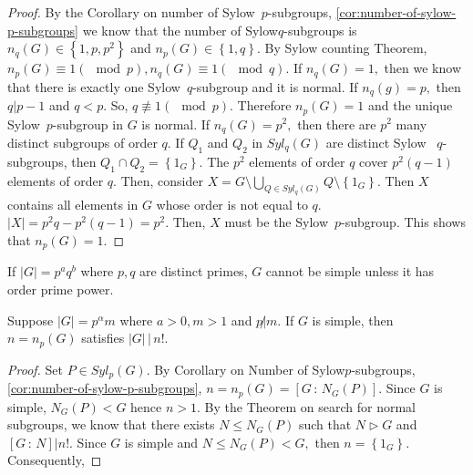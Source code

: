 \begin{theorem}
\end{theorem}

\begin{proof}
	By the Corollary on number of Sylow~$p$\nobreakdash-subgroups, 
	\cref{cor:number-of-sylow-p-subgroups} we know that the number of
	Sylow$q$\nobreakdash-subgroups is $n_q(G) \in \left\{ 1, p, p^2 \right\} $ and
	$n_p(G) \in \left\{ 1, q \right\} .$ By Sylow counting Theorem,
	$n_p(G) \equiv 1 (\mod p ), n_q(G) \equiv 1 (\mod q ).$ If $n_q(G) = 1,$
	then we know that there is exactly one Sylow~$q$\nobreakdash-subgroup
	and it is normal.
	If $n_q(g) = p,$ then $q | p-1$ and $ q < p.$ So, $q \not \equiv 1 
	(\mod p).$ Therefore $n_p(G) = 1$ and the unique Sylow~$p$\nobreakdash-subgroup
	in $G$ is normal. If $n_q(G) = p^2,$ then there are $p^2$ many distinct
	subgroups of order $q.$ If $Q_1$ and $Q_2$ in $Syl_q(G)$ are distinct Sylow~
	$q$\nobreakdash-subgroups, then $Q_1 \cap Q_2 = \left\{ 1_G \right\} .$
	The $p^2$ elements of order $q$ cover $p^2(q-1)$ elements of order $q.$
	Then, consider $X = G \setminus \bigcup_{Q \in Syl_q(G)} Q \setminus \left\{ 
	1_G\right\} .$ Then $X$ contains all elements in $G$ whose order is not equal to 
	$q.$ $ \lvert X \rvert = p^2 q - p^2(q-1) = p^2.$ Then,
	$X$ must be the Sylow~$p$\nobreakdash-subgroup. This shows that
	$n_p(G) = 1.$
\end{proof}

\begin{remark}[Burnside]
	If $ \lvert G \rvert = p^a q^b$ where $p,q$ are distinct primes, $G$ cannot
	be simple unless it has order prime power.
\end{remark}


\begin{lemma}
	Suppose $ \lvert G \rvert = p^\alpha m$ where $a >0, m>1$ and $
	p \not | m.$ If $ G$ is simple, then $n = n_p(G) $ satisfies $ \lvert G \rvert
	\, | \, n!. $
\end{lemma}

\begin{proof}
	Set $P \in Syl_p(G)$. By Corollary on Number of Sylow$p$\nobreakdash-subgroups,
	\cref{cor:number-of-sylow-p-subgroups},
	$n = n_p(G) = \left[ G \, : \, N_G(P) \right] .$ Since $G$ is simple, 
	$N_G(P) < G$ hence $ n >1.$ By the Theorem on search for normal subgroups,
	we know that there exists $N \leq N_G(P) $ such that $ N \triangleright G$
	and $ \left[ G \, : \, N \right] | n!.$ Since $G$ is simple and $N \leq N_G(P) 
	< G,$ then $n = \left\{ 1_G \right\} .$ Consequently, 
\end{proof}

